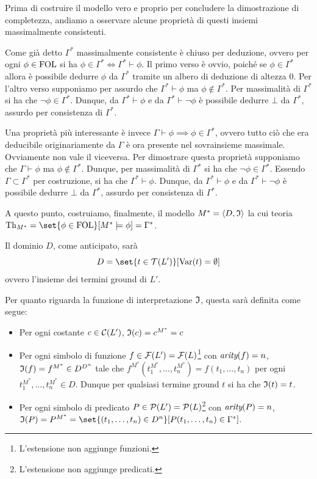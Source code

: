 Prima di costruire il modello vero e proprio per concludere la dimostrazione di completezza, andiamo a osservare alcune proprietà di questi insiemi massimalmente consistenti.

Come già detto \(\Gamma^*\) massimalmente consistente è chiuso per deduzione, ovvero per ogni \(\phi \in \FOL\) si ha \(\phi \in \Gamma^* \iff \Gamma^* \vdash \phi\).
Il primo verso è ovvio, poiché se \(\phi \in \Gamma^*\) allora è possibile dedurre \(\phi\) da \(\Gamma^*\) tramite un albero di deduzione di altezza \(0\). Per l'altro verso supponiamo per assurdo che \(\Gamma^* \vdash \phi\) ma \(\phi \notin \Gamma^*\). Per massimalità di \(\Gamma^*\) si ha che \(\neg \phi \in \Gamma^*\). Dunque, da \(\Gamma^* \vdash \phi\) e da \(\Gamma^* \vdash \neg \phi\) è possibile dedurre \(\bot\) da \(\Gamma^*\), assurdo per consistenza di \(\Gamma^*\).

Una proprietà più interessante è invece \(\Gamma \vdash \phi \implies \phi \in \Gamma^*\), ovvero tutto ciò che era deducibile originariamente da \(\Gamma\) è ora presente nel sovrainsieme massimale. Ovviamente non vale il viceversa. Per dimostrare questa proprietà supponiamo che \(\Gamma \vdash \phi\) ma \(\phi \notin \Gamma^*\). Dunque, per massimalità di \(\Gamma^*\) si ha che \(\neg \phi \in \Gamma^*\). Essendo \(\Gamma\subset\Gamma^*\) per costruzione, si ha che \(\Gamma^* \vdash \phi\). Dunque, da \(\Gamma^* \vdash \phi\) e da \(\Gamma^* \vdash \neg \phi\) è possibile dedurre \(\bot\) da \(\Gamma^*\), assurdo per consistenza di \(\Gamma^*\).

\vspace{1cm}
A questo punto, costruiamo, finalmente, il modello \(M^* = \langle D, \mathfrak{I}\rangle\) la cui teoria \(\Th{M^*} = \set{\phi \in \FOL}[M^* \models \phi] = \Gamma^*\).

Il dominio \(D\), come anticipato, sarà
\[D = \set{t\in \Terms(L')}[\Var(t) = \emptyset]\]
ovvero l'insieme dei termini ground di \(L'\).

Per quanto riguarda la funzione di interpretazione \(\mathfrak{I}\), questa sarà definita come segue:

\begin{itemize}
  \item Per ogni costante \(c\in \mathcal{C}(L')\), \(\mathfrak{I}(c) = c^{M^*} = c\)
  \item Per ogni simbolo di funzione \(f\in \mathcal{F}(L') = \mathcal{F}(L)\)\footnote{L'estensione non aggiunge funzioni.} con \(\operatorname{\textit{arity}}(f) = n\), \(\mathfrak{I}(f) = f^{M^*} \in D^{D^n}\) tale che \(f^{M^*}(t_1^{M^*}, \ldots, t_n^{M^*}) = f(t_1, \ldots, t_n)\) per ogni \(t_1^{M^*}, \ldots, t_n^{M^*} \in D\). Dunque per qualsiasi termine ground \(t\) si ha che \(\mathfrak{I}(t) = t\).
  \item Per ogni simbolo di predicato \(P\in \mathcal{P}(L') = \mathcal{P}(L)\)\footnote{L'estensione non aggiunge predicati.} con \(\operatorname{\textit{arity}}(P) = n\), \(\Interp(P) = P^{M^*} =\set{(t_1, \ldots, t_n) \in D^n}[P(t_1, \ldots, t_n) \in \Gamma^*]\).
\end{itemize}

